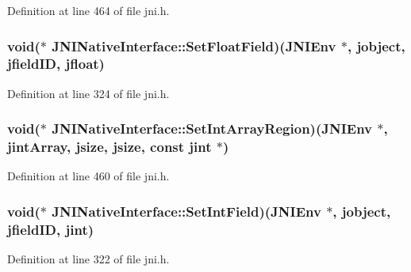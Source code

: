 Definition at line 464 of file jni.\-h.

\hypertarget{struct_j_n_i_native_interface_a0d414acf09ec31577b410df6278ae2dc}{
\subsubsection[{Set\-Float\-Field}]{\setlength{\rightskip}{0pt plus 5cm}void($\ast$ J\-N\-I\-Native\-Interface\-::\-Set\-Float\-Field)({\bf J\-N\-I\-Env} $\ast$, {\bf jobject}, {\bf jfield\-I\-D}, {\bf jfloat})}}\label{struct_j_n_i_native_interface_a0d414acf09ec31577b410df6278ae2dc}


Definition at line 324 of file jni.\-h.

\hypertarget{struct_j_n_i_native_interface_a60e5b1a6ff021e0a617383da2bb5c5f5}{
\subsubsection[{Set\-Int\-Array\-Region}]{\setlength{\rightskip}{0pt plus 5cm}void($\ast$ J\-N\-I\-Native\-Interface\-::\-Set\-Int\-Array\-Region)({\bf J\-N\-I\-Env} $\ast$, {\bf jint\-Array}, {\bf jsize}, {\bf jsize}, const {\bf jint} $\ast$)}}\label{struct_j_n_i_native_interface_a60e5b1a6ff021e0a617383da2bb5c5f5}


Definition at line 460 of file jni.\-h.

\hypertarget{struct_j_n_i_native_interface_a8d96188709a3c8e5d25be4d23cbd1d7d}{
\subsubsection[{Set\-Int\-Field}]{\setlength{\rightskip}{0pt plus 5cm}void($\ast$ J\-N\-I\-Native\-Interface\-::\-Set\-Int\-Field)({\bf J\-N\-I\-Env} $\ast$, {\bf jobject}, {\bf jfield\-I\-D}, {\bf jint})}}\label{struct_j_n_i_native_interface_a8d96188709a3c8e5d25be4d23cbd1d7d}


Definition at line 322 of file jni.\-h.

